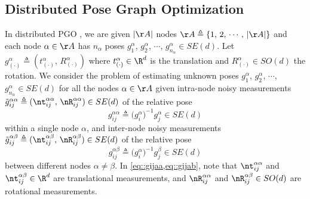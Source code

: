 \subsection{Distributed Pose Graph Optimization}
In distributed PGO \cite{tron2014distributed,choudhary2017distributed,tian2019distributed}, we are given $|\AA|$ nodes $\AA\triangleq\{1,\,2,\,\cdots,\, |\AA|\}$ and each node $\alpha\in\AA$ has $n_\alpha$ poses $g_{1}^\alpha$, $g_{2}^\alpha$, $\cdots$, $g_{n_\alpha}^\alpha\in SE(d)$. Let $g_{(\cdot)}^\alpha\triangleq(t_{(\cdot)}^\alpha,\,R_{(\cdot)}^\alpha)$ where $t_{(\cdot)}^\alpha\in\R^d$ is the translation and $R_{(\cdot)}^\alpha\in SO(d)$ the rotation.  We consider the problem of estimating unknown poses $g_{1}^\alpha$, $g_{2}^\alpha$, $\cdots$, $g_{n_\alpha}^\alpha\in SE(d)$ for all the nodes $\alpha\in\AA$ given intra-node noisy measurements $\tilde{g}_{ij}^{\alpha\alpha}\triangleq(\nt_{ij}^{\alpha\alpha},\,\nR_{ij}^{\alpha\alpha})\in SE(d)$ of the relative pose
\vspace{-0.25em}
\begin{equation}\label{eq::gijaa}
g_{ij}^{\alpha\alpha} \triangleq \big({g_i^\alpha}\big)^{-1} g_j^\alpha\in SE(d)
\end{equation}
within a single node $\alpha$, and inter-node noisy measurements $\tilde{g}_{ij}^{\alpha\beta}\triangleq(\nt_{ij}^{\alpha\beta},\,\nR_{ij}^{\alpha\beta})\in SE(d)$ of the relative pose
\begin{equation}\label{eq::gijab}
g_{ij}^{\alpha\beta} \triangleq \big({g_i^\alpha}\big)^{-1} g_j^\beta\in SE(d)
\end{equation}
between different nodes $\alpha\neq\beta$.  In \cref{eq::gijaa,eq::gijab}, note that $\nt_{ij}^{\alpha\alpha}$ and $\nt_{ij}^{\alpha\beta}\in\R^d$ are translational measurements, and $\nR_{ij}^{\alpha\alpha}$ and $\nR_{ij}^{\alpha\beta}\in SO(d)$ are rotational measurements.


